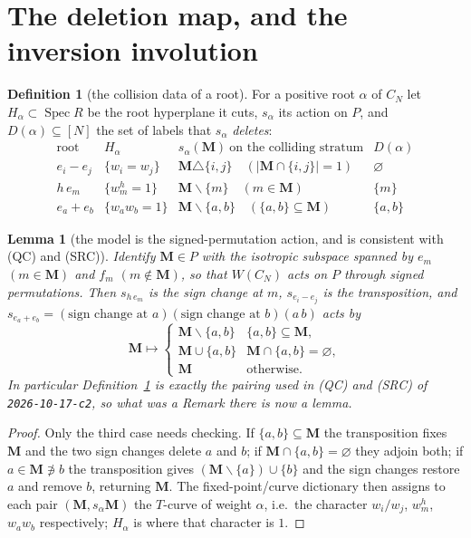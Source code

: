 \documentclass[11pt]{article}
\newtheorem{lem}[thm]{Lemma}
\theoremstyle{definition}
\newtheorem{defn}[thm]{Definition}
\newcommand{\bM}{\mathbf{M}}
\newcommand{\sm}{\smallsetminus}
\begin{document}
\section{The deletion map, and the inversion involution}
\label{sec:mech}

\begin{defn}[the collision data of a root]\label{def:D}
For a positive root $\alpha$ of $C_N$ let $H_\alpha\subset\operatorname{Spec}R$ be
the root hyperplane it cuts, $s_\alpha$ its action on $P$, and
$D(\alpha)\subseteq[N]$ the set of labels that $s_\alpha$ \emph{deletes}:
\[
\begin{array}{llll}
\text{root} & H_\alpha & s_\alpha(\bM)\ \text{on the colliding stratum} & D(\alpha)\\\hline
e_i-e_j & \{w_i=w_j\} & \bM\triangle\{i,j\}\quad(|\bM\cap\{i,j\}|=1) & \varnothing\\
h\,e_m  & \{w_m^{h}=1\}&\bM\sm\{m\}\quad(m\in\bM) & \{m\}\\
e_a+e_b & \{w_aw_b=1\}&\bM\sm\{a,b\}\quad(\{a,b\}\subseteq\bM) & \{a,b\}
\end{array}
\]
\end{defn}

\begin{lem}[the model is the signed-permutation action, and is consistent with
\textup{(QC)} and \textup{(SRC)}]\label{lem:model}
Identify $\bM\in P$ with the isotropic subspace spanned by $e_m$ $(m\in\bM)$ and
$f_m$ $(m\notin\bM)$, so that $W(C_N)$ acts on $P$ through signed permutations.
Then $s_{h\,e_m}$ is the sign change at $m$, $s_{e_i-e_j}$ is the transposition,
and $s_{e_a+e_b}=(\text{sign change at }a)(\text{sign change at }b)(a\,b)$ acts by
\[
  \bM\mapsto\begin{cases}\bM\sm\{a,b\}&\{a,b\}\subseteq\bM,\\
  \bM\cup\{a,b\}&\bM\cap\{a,b\}=\varnothing,\\ \bM&\text{otherwise.}\end{cases}
\]
In particular Definition~\ref{def:D} is exactly the pairing used in \textup{(QC)}
and \textup{(SRC)} of \texttt{2026-10-17-c2}, so what was a Remark there is now a
lemma.
\end{lem}

\begin{proof}
Only the third case needs checking.  If $\{a,b\}\subseteq\bM$ the transposition
fixes $\bM$ and the two sign changes delete $a$ and $b$; if
$\bM\cap\{a,b\}=\varnothing$ they adjoin both; if $a\in\bM\not\ni b$ the
transposition gives $(\bM\sm\{a\})\cup\{b\}$ and the sign changes restore $a$ and
remove $b$, returning $\bM$.  The fixed-point/curve dictionary then assigns to
each pair $(\bM,s_\alpha\bM)$ the $T$-curve of weight $\alpha$, i.e.\ the
character $w_i/w_j$, $w_m^{h}$, $w_aw_b$ respectively; $H_\alpha$ is where that
character is $1$.
\end{proof}
\end{document}
